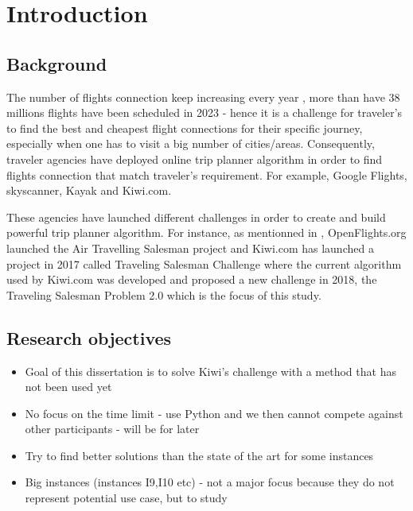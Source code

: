 \chapter{Introduction}
\label{Chapter1}



\section{Background}

The number of flights connection keep increasing every year \cite{statista_flights_year}, more than have 38 millions flights have been scheduled in 2023 - hence it is a challenge for traveler's to find the best and cheapest flight connections for their specific journey, especially when one has to visit a big number of cities/areas.
Consequently, traveler agencies have deployed online trip planner algorithm in order to find flights connection that match traveler's requirement. For example, Google Flights, skyscanner, Kayak and Kiwi.com.

These agencies have launched different challenges in order to create and build powerful trip planner algorithm. For instance, as mentionned in \cite{reinforcement_learning_yaro}, OpenFlights.org launched the Air Travelling Salesman project and Kiwi.com has launched a project in 2017 called Traveling Salesman Challenge where the current algorithm used by Kiwi.com was developed and proposed a new challenge in 2018, the Traveling Salesman Problem 2.0 which is the focus of this study.



\section{Research objectives}

\begin{itemize}
    \item Goal of this dissertation is to solve Kiwi's challenge with a method that has not been used yet
    \item No focus on the time limit - use Python and we then cannot compete against other participants - will be for later
    \item Try to find better solutions than the state of the art for some instances
    \item Big instances (instances I9,I10 etc) - not a major focus because they do not represent potential use case, but to study
\end{itemize}

